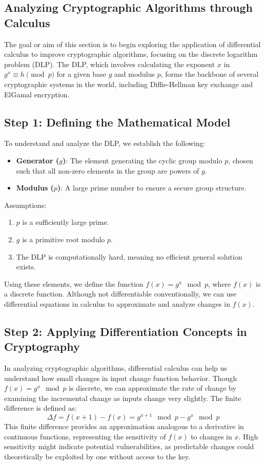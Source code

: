 \documentclass[12pt]{article}
\begin{document}
\subsection{Analyzing Cryptographic Algorithms through Calculus}
The goal or aim of this section is to begin exploring  the application of differential calculus to improve cryptographic algorithms,  focusing on the discrete logarithm problem (DLP). The DLP, which involves calculating the exponent \( x \) in \( g^x \equiv h \pmod{p} \) for a given base \( g \) and modulus \( p \), forms the backbone of several cryptographic systems in the world, including Diffie-Hellman key exchange and ElGamal encryption.

\subsection{Step 1: Defining the Mathematical Model}
To understand and analyze the DLP, we establish the following:
\begin{itemize}
    \item \textbf{Generator (\( g \))}: The element generating the cyclic group modulo \( p \), chosen such that all non-zero elements in the group are powers of \( g \).
    \item \textbf{Modulus (\( p \))}: A large prime number to ensure a secure group structure.
\end{itemize}

Assumptions:
\begin{enumerate}
    \item \( p \) is a sufficiently large prime.
    \item \( g \) is a primitive root modulo \( p \).
    \item The DLP is computationally hard, meaning no efficient general solution exists.
\end{enumerate}

Using these elements, we define the function \( f(x) = g^x \mod p \), where \( f(x) \) is a discrete function. Although not differentiable conventionally, we can use differential equations in calculus to approximate and analyze changes in \( f(x) \).

\subsection{Step 2: Applying Differentiation Concepts in Cryptography}
In analyzing cryptographic algorithms, differential calculus can help us understand how small changes in input change function behavior. Though \( f(x) = g^x \mod p \) is discrete, we can approximate the rate of change by examining the incremental change as inputs change very slightly. The finite difference is defined as:
\[
\Delta f = f(x+1) - f(x) = g^{x+1} \mod p - g^x \mod p
\]
This finite difference provides an approximation analogous to a derivative in continuous functions, representing the sensitivity of \( f(x) \) to changes in \( x \). High sensitivity might indicate potential vulnerabilities, as predictable changes could theoretically be exploited by one without access to the key.
\end{document}
